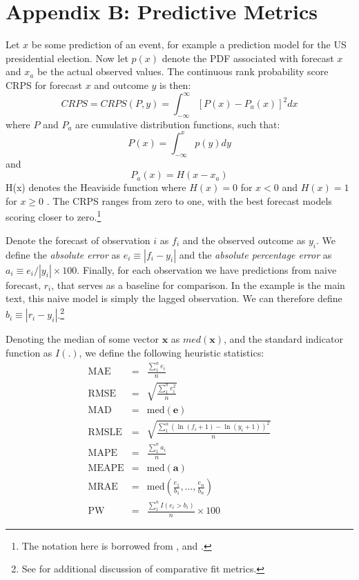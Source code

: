 \documentclass[12pt,fullpage,endnotes]{article}
\begin{document}
 \section*{Appendix B: Predictive Metrics}
Let $x$ be some prediction of an event, for example a prediction model for the US presidential election. Now let $p(x)$ denote the PDF associated with forecast $x$ and $x_a$ be the actual observed values. The continuous rank probability score CRPS for forecast $x$ and outcome $y$ is then:
\begin{equation}
CRPS=CRPS(P,y)=\int^{\infty}_{-\infty} [P(x)-P_a(x)]^2 dx
\end{equation}
where $P$ and $P_a$ are cumulative distribution functions, such that:
\begin{equation}
P(x)=\int^{x}_{-\infty} p(y) dy
\end{equation}
and 
\begin{equation}
P_a(x)=H(x-x_a)
\end{equation}
H(x) denotes the Heaviside function where $H(x)=0$ for $x<0$ and $H(x)=1$ for $x\geq0$ \citep{Hersbach:2000}. The CRPS ranges from zero to one, with the best forecast models scoring closer to zero.\footnote{The notation here is borrowed from \citet{Hersbach:2000}, and \citet{GneitingEtAl:2007}.}

Denote the forecast of observation $i$ as $f_i$ and the observed
outcome as $y_i$.  We define the \textit{absolute error} as $e_i\equiv
|f_i - y_i|$ and the \textit{absolute percentage error} as $a_i \equiv
e_i / |y_i| \times 100$.  Finally, for each observation we have
predictions from naive forecast, $r_i$, that serves as a baseline for
comparison.  In the example is the main text, this naive model is
simply the lagged observation.  We can therefore define $b_i \equiv
|r_i - y_i|$.\footnote{See \citet{brandt:freeman:schrodt:2011} for
  additional discussion of comparative fit metrics.}

Denoting the median of some vector $\mathbf{x}$ as $med(\mathbf{x})$, and the standard indicator function as $I(.)$, we define the following heuristic statistics:
 \begin{eqnarray*}
 \mathrm{MAE} &=& \frac{\sum_1^n{e_i}}{n}\\
  \mathrm{RMSE} &=& \sqrt{\frac{\sum_1^n{e^2_i}}{n}} \\
  \mathrm{MAD} &=& \mathrm{med}(\mathbf{e}) \\
  \mathrm{RMSLE} &=& \sqrt{\frac{\sum_1^n\left(\ln(f_i+1) - \ln(y_i+1)  \right)^2}{n}} \\
  \mathrm{MAPE} &=& \frac{\sum_1^n{a_i}}{n} \\
   \mathrm{MEAPE} &=& \mathrm{med}(\mathbf{a}) \\
 \mathrm{MRAE} &=& \mathrm{med}\left(\frac{e_1}{b_1}, \ldots, \frac{e_n}{b_n} \right) \\
 \mathrm{PW} &=& \frac{\sum_1^nI(e_i > b_i)}{n} \times 100
\end{eqnarray*}
\end{document}
